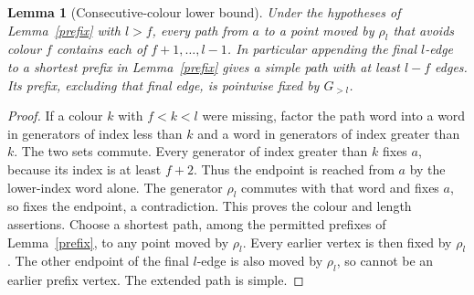 \documentclass[11pt,a4paper]{article}
\newtheorem{lemma}{Lemma}
\begin{document}
\begin{lemma}[Consecutive-colour lower bound]\label{length}
Under the hypotheses of Lemma~\ref{prefix} with $l>f$, every
path from $a$ to a point moved by $\rho_l$ that avoids colour $f$
contains each of $f+1,\ldots,l-1$. In particular appending the
final $l$-edge to a shortest prefix in Lemma~\ref{prefix} gives
a simple path with at least $l-f$ edges. Its prefix, excluding
that final edge, is pointwise fixed by $G_{>l}$.
\end{lemma}
\begin{proof}
If a colour $k$ with $f<k<l$ were missing, factor the path word
into a word in generators of index less than $k$ and a word in
generators of index greater than $k$. The two sets commute.
Every generator of index greater than $k$ fixes $a$, because
its index is at least $f+2$. Thus the endpoint is reached from
$a$ by the lower-index word alone. The generator $\rho_l$
commutes with that word and fixes $a$, so fixes the endpoint,
a contradiction. This proves the colour and length assertions.
Choose a shortest path, among the permitted prefixes of
Lemma~\ref{prefix}, to any point moved by $\rho_l$. Every
earlier vertex is then fixed by $\rho_l$. The other endpoint
of the final $l$-edge is also moved by $\rho_l$, so cannot be
an earlier prefix vertex. The extended path is simple.
\end{proof}
\end{document}
